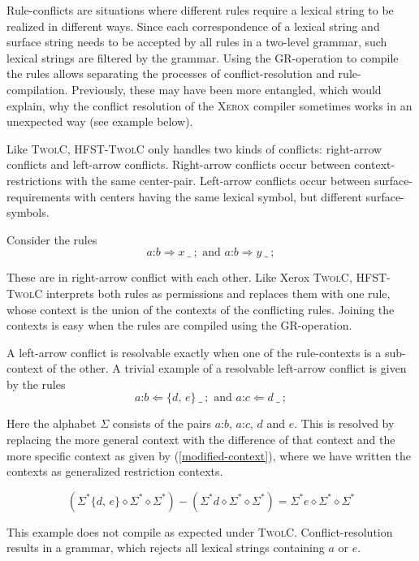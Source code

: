 \documentclass[a4paper]{article}
\begin{document}
Rule-conflicts are situations where different rules require a lexical
string to be realized in different ways. Since each correspondence of
a lexical string and surface string needs to be accepted by all rules
in a two-level grammar, such lexical strings are filtered by the
grammar. Using the GR-operation to compile the rules allows separating
the processes of conflict-resolution and rule-compilation. Previously,
these may have been more entangled, which would explain, why the
conflict resolution of the \textsc{Xerox} compiler sometimes works in
an unexpected way (see example below).

Like \textsc{TwolC}, \textsc{HFST-TwolC} only handles two kinds of
conflicts: right-arrow conflicts and left-arrow conflicts. Right-arrow
conflicts occur between context-restrictions with the same
center-pair. Left-arrow conflicts occur between surface-requirements
with centers having the same lexical symbol, but different
surface-symbols.

Consider the rules
$$a\text{:}b \Rightarrow x \ \_\ ;\text{ and }a\text{:}b \Rightarrow
y\ \_\ ;$$

These are in right-arrow conflict with each other. Like Xerox
\textsc{TwolC}, \textsc{HFST-TwolC} interprets both rules as
permissions and replaces them with one rule, whose context is the
union of the contexts of the conflicting rules. Joining the contexts
is easy when the rules are compiled using the GR-operation.

A left-arrow conflict is resolvable exactly when one of the
rule-contexts is a sub-context of the other. A trivial example of a
resolvable left-arrow conflict is given by the rules
$$a\text{:}b \Leftarrow \{d\text{, }e\}\ \_\ ;\text{ and }a\text{:}c
\Leftarrow d\ \_\ ;$$ 

Here the alphabet $\Sigma$ consists of the pairs $a\text{:}b$,
$a\text{:}c$, $d$ and $e$. This is resolved by replacing the more
general context with the difference of that context and the more
specific context as given by (\ref{modified-context}), where we have
written the contexts as generalized restriction contexts.

\begin{equation}
  \label{modified-context}
  (\Sigma^* \{d\text{, }e\}\diamond \Sigma^* \diamond \Sigma^*) -
  (\Sigma^* d \diamond \Sigma^* \diamond \Sigma^*) = \Sigma^*
  e\diamond \Sigma^* \diamond \Sigma^*
\end{equation}

This example does not compile as expected under
\textsc{TwolC}. Conflict-resolution results in a grammar, which
rejects all lexical strings containing $a$ or $e$.
\end{document}
